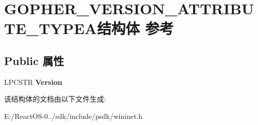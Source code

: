 \hypertarget{struct_g_o_p_h_e_r___v_e_r_s_i_o_n___a_t_t_r_i_b_u_t_e___t_y_p_e_a}{}\section{G\+O\+P\+H\+E\+R\+\_\+\+V\+E\+R\+S\+I\+O\+N\+\_\+\+A\+T\+T\+R\+I\+B\+U\+T\+E\+\_\+\+T\+Y\+P\+E\+A结构体 参考}
\label{struct_g_o_p_h_e_r___v_e_r_s_i_o_n___a_t_t_r_i_b_u_t_e___t_y_p_e_a}
\subsection*{Public 属性}
\begin{DoxyCompactItemize}
\item 
\mbox{\label{struct_g_o_p_h_e_r___v_e_r_s_i_o_n___a_t_t_r_i_b_u_t_e___t_y_p_e_a_aa97ddfb09282dedb1947a7236aaccf3a}} 
L\+P\+C\+S\+TR {\bfseries Version}
\end{DoxyCompactItemize}


该结构体的文档由以下文件生成\+:\begin{DoxyCompactItemize}
\item 
E\+:/\+React\+O\+S-\/0../sdk/include/psdk/wininet.\+h\end{DoxyCompactItemize}

